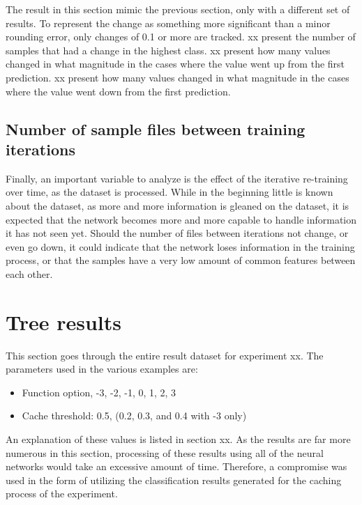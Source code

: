 The result in this section mimic the previous section, only with a different set of results.
To represent the change as something more significant than a minor rounding error, only changes of 0.1 or more are tracked.
xx present the number of samples that had a change in the highest class.
xx present how many values changed in what magnitude in the cases where the value went up from the first prediction.
xx present how many values changed in what magnitude in the cases where the value went down from the first prediction.

\subsection{Number of sample files between training iterations}
Finally, an important variable to analyze is the effect of the iterative re-training over time, as the dataset is processed.
While in the beginning little is known about the dataset, as more and more information is gleaned on the dataset, it is expected that the network becomes more and more capable to handle information it has not seen yet.
Should the number of files between iterations not change, or even go down, it could indicate that the network loses information in the training process, or that the samples have a very low amount of common features between each other.


\section{Tree results}
This section goes through the entire result dataset for experiment xx.
The parameters used in the various examples are:

\begin{itemize}
    \item Function option, -3, -2, -1, 0, 1, 2, 3
    \item Cache threshold: 0.5, (0.2, 0.3, and 0.4 with -3 only)
\end{itemize}{}

An explanation of these values is listed in section xx.
As the results are far more numerous in this section, processing of these results using all of the neural networks would take an excessive amount of time.
Therefore, a compromise was used in the form of utilizing the classification results generated for the caching process of the experiment.

